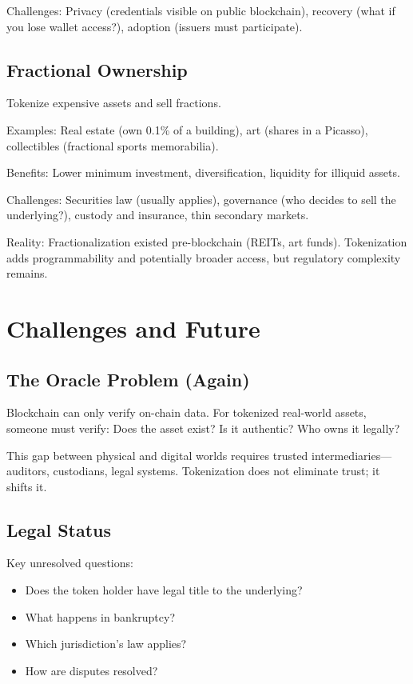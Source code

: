 \documentclass[11pt,a4paper]{article}
\begin{document}
Challenges: Privacy (credentials visible on public blockchain), recovery (what if you lose wallet access?), adoption (issuers must participate).

\subsection{Fractional Ownership}

Tokenize expensive assets and sell fractions.

Examples: Real estate (own 0.1\% of a building), art (shares in a Picasso), collectibles (fractional sports memorabilia).

Benefits: Lower minimum investment, diversification, liquidity for illiquid assets.

Challenges: Securities law (usually applies), governance (who decides to sell the underlying?), custody and insurance, thin secondary markets.

Reality: Fractionalization existed pre-blockchain (REITs, art funds). Tokenization adds programmability and potentially broader access, but regulatory complexity remains.

\section{Challenges and Future}

\subsection{The Oracle Problem (Again)}

Blockchain can only verify on-chain data. For tokenized real-world assets, someone must verify: Does the asset exist? Is it authentic? Who owns it legally?

This gap between physical and digital worlds requires trusted intermediaries---auditors, custodians, legal systems. Tokenization does not eliminate trust; it shifts it.

\subsection{Legal Status}

Key unresolved questions:
\begin{itemize}
    \item Does the token holder have legal title to the underlying?
    \item What happens in bankruptcy?
    \item Which jurisdiction's law applies?
    \item How are disputes resolved?
\end{itemize}
\end{document}
